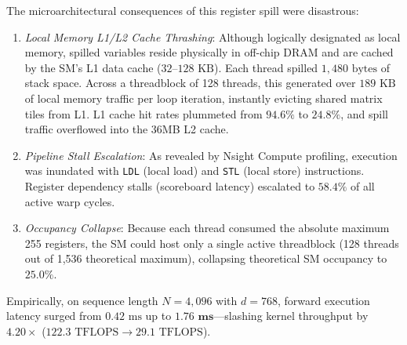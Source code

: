 The microarchitectural consequences of this register spill were disastrous:
\begin{enumerate}
    \item \emph{Local Memory L1/L2 Cache Thrashing}: Although logically designated as local memory, spilled variables reside physically in off-chip DRAM and are cached by the SM's L1 data cache ($32\text{--}128\text{ KB}$). Each thread spilled $1{,}480\text{ bytes}$ of stack space. Across a threadblock of 128 threads, this generated over $189\text{ KB}$ of local memory traffic per loop iteration, instantly evicting shared matrix tiles from L1. L1 cache hit rates plummeted from $94.6\%$ to $24.8\%$, and spill traffic overflowed into the 36MB L2 cache.
    \item \emph{Pipeline Stall Escalation}: As revealed by Nsight Compute profiling, execution was inundated with \texttt{LDL} (local load) and \texttt{STL} (local store) instructions. Register dependency stalls (scoreboard latency) escalated to $58.4\%$ of all active warp cycles.
    \item \emph{Occupancy Collapse}: Because each thread consumed the absolute maximum 255 registers, the SM could host only a single active threadblock (128 threads out of 1,536 theoretical maximum), collapsing theoretical SM occupancy to $\mathbf{25.0\%}$.
\end{enumerate}
Empirically, on sequence length $N=4{,}096$ with $d=768$, forward execution latency surged from $0.42\text{ ms}$ up to $\mathbf{1.76\text{ ms}}$---slashing kernel throughput by \textbf{$4.20\times$} ($122.3\text{ TFLOPS} \to 29.1\text{ TFLOPS}$).

